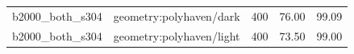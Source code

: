 \begin{longtable}{l>{\raggedright\arraybackslash}p{.42\linewidth}rrr}
b2000\_\allowbreak{}both\_\allowbreak{}s304 & %
geometry:polyhaven/dark & %
400 & %
76.00 & %
99.09 \\ %

b2000\_\allowbreak{}both\_\allowbreak{}s304 & %
geometry:polyhaven/light & %
400 & %
73.50 & %
99.00 \\ %


\end{longtable}
